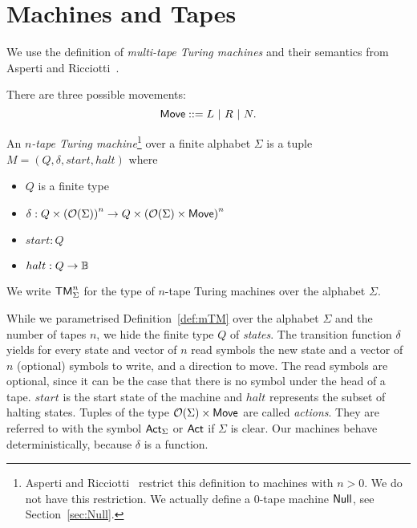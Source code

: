 \section{Machines and Tapes}
\label{sec:machine-tapes}

We use the definition of \emph{multi-tape Turing machines} and their semantics from Asperti and Ricciotti~\cite{asperti2015}.

\begin{definition}[Movement]
  \label{def:movement}
  There are three possible movements:
  $$\mathsf{Move} ::= L ~|~ R ~|~ N.$$
\end{definition}


\begin{definition}
  \label{def:mTM}
  An \emph{$n$-tape Turing machine}\footnote{Asperti and Ricciotti~\cite{asperti2015} restrict this definition to machines with $n>0$.  We do not have
    this restriction.  We actually define a $0$-tape machine $\mathsf{Null}$, see Section~\ref{sec:Null}.} over a finite alphabet $\Sigma$ is a tuple
  $M = (Q, \delta, start, halt)$ where
  \begin{itemize}
  \item $Q$ is a finite type
  \item $\delta : Q \times \left(\mathcal{O}(\Sigma)\right)^n \rightarrow Q \times \left(\mathcal{O}(\Sigma) \times \mathsf{Move}\right)^n$
  \item $start:Q$
  \item $halt : Q \rightarrow \mathbb{B}$ 
  \end{itemize}
\end{definition}

We write $\mathsf{TM}_\Sigma^n$ for the type of $n$-tape Turing machines over the alphabet $\Sigma$.

While we parametrised Definition~\ref{def:mTM} over the alphabet $\Sigma$ and the number of tapes $n$, we hide the finite type $Q$ of \emph{states}.
The transition function $\delta$ yields for every state and vector of $n$ read symbols the new state and a vector of $n$ (optional) symbols to write,
and a direction to move.  The read symbols are optional, since it can be the case that there is no symbol under the head of a tape.  $start$ is the
start state of the machine and $halt$ represents the subset of halting states.  Tuples of the type $\mathcal{O}(\Sigma) \times \mathsf{Move}$ are called
\emph{actions}.  They are referred to with the symbol $\mathsf{Act}_\Sigma$ or $\mathsf{Act}$ if $\Sigma$ is clear.  Our machines behave deterministically,
because $\delta$ is a function.

